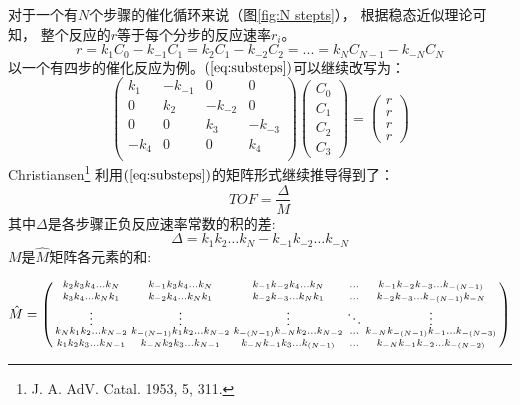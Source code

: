 \documentclass[a4paper,titlepage]{article}
\begin{document}
对于一个有$N$个步骤的催化循环来说（图\ref{fig:N stepts}），
根据稳态近似理论可知，
整个反应的$r$等于每个分步的反应速率$r_i$。
\begin{equation}\label{eq:substeps}
    r = k_1C_0 - k_{-1}C_{1} =k_2C_1 - k_{-2}C_{2}=...=k_NC_{N-1} - k_{-N}C_{N}
\end{equation}
以一个有四步的催化反应为例。$(\ref{eq:substeps})$可以继续改写为：
\begin{equation*}
\begin{pmatrix}
   k_1 & -k_{-1} & 0 & 0  \\
   0 & k_2 & -k_{-2} & 0  \\
   0 & 0 & k_3 & -k_{-3}  \\
  -k_{4} & 0 & 0 & k_4  \\
\end{pmatrix}
\begin{pmatrix}
  C_{0}  \\
  C_{1}  \\
  C_{2}  \\
  C_{3}
\end{pmatrix}
=
\begin{pmatrix}
  r  \\
  r  \\
  r  \\
  r
\end{pmatrix}
\end{equation*}
Christiansen\footnote{J. A. AdV. Catal. 1953, 5, 311.}
利用$(\ref{eq:substeps})$的矩阵形式继续推导得到了：
\begin{equation}\label{eq:TOF=Delta/M}
  TOF = \frac{\Delta{}}{M}
\end{equation}
其中$\Delta{}$是各步骤正负反应速率常数的积的差:
\begin{equation}
  \Delta{}=k_1k_2\hdots{}k_N-k_{-1}k_{-2}\hdots{}k_{-N}
\end{equation}
$M$是$\hat{M}$矩阵各元素的和:

\begin{equation}
  \hat{M}=
  \begin{psmallmatrix}
     k_{2}k_{3}k_{4}\hdots{}k_{N} & k_{-1}k_{3}k_{4}\hdots{}k_{N} & k_{-1}k_{-2}k_{4}\hdots{}k_{N} &\hdots{}& k_{-1}k_{-2}k_{-3}\hdots{}k_{-(N-1)}\\
     k_{3}k_{4}\hdots{}k_{N}k_{1} & k_{-2}k_{4}\hdots{}k_{N}k_{1} & k_{-2}k_{-3}\hdots{}k_{N}k_{1} &\hdots{}& k_{-2}k_{-3}\hdots{}k_{-(N-1)}k_{-N}\\
     \vdots{} & \vdots{} & \vdots{} & \ddots & \vdots \\
     k_{N}k_{1}k_{2}\hdots{}k_{N-2} & k_{-(N-1)}k_{1}k_{2}\hdots{}k_{N-2} & k_{-(N-1)}k_{-N}k_2\hdots{}k_{N-2} & \hdots{}&k_{-N}k_{-(N-1)}k_{-1}\hdots{}k_{-(N-3)}\\
     k_{1}k_{2}k_{3}\hdots{}k_{N-1} & k_{-N}k_{2}k_{3}\hdots{}k_{N-1} & k_{-N}k_{-1}k_{3}\hdots{}k_{(N-1)} &\hdots{}& k_{-N}k_{-1}k_{-2}\hdots{}k_{-(N-2)}\\
  \end{psmallmatrix}
\end{equation}
\end{document}
